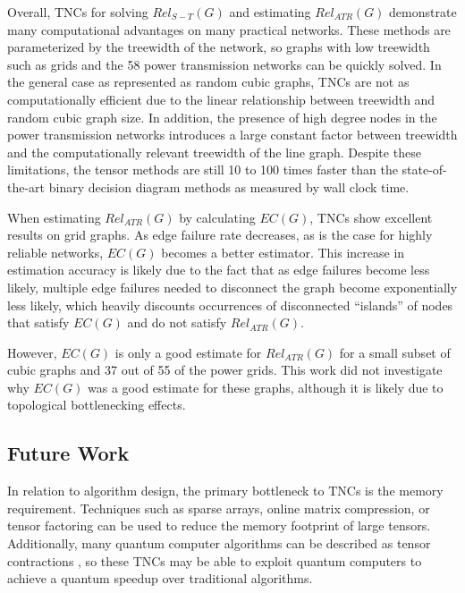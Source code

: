 \documentclass[12pt,twocolumn]{article}
\begin{document}
Overall, TNCs for solving \(Rel_{S-T}(G)\) and estimating \(Rel_{ATR}(G)\) demonstrate many computational advantages on many practical networks. These methods are parameterized by the treewidth of the network, so graphs with low treewidth such as grids and the 58 power transmission networks can be quickly solved. In the general case as represented as random cubic graphs, TNCs are not as computationally efficient due to the linear relationship between treewidth and random cubic graph size. In addition, the presence of high degree nodes in the power transmission networks introduces a large constant factor between treewidth and the computationally relevant treewidth of the line graph. Despite these limitations, the tensor methods are still 10 to 100 times faster than the state-of-the-art binary decision diagram methods as measured by wall clock time.

When estimating \(Rel_{ATR}(G)\) by calculating \(EC(G)\), TNCs show excellent results on grid graphs. As edge failure rate decreases, as is the case for highly reliable networks, \(EC(G)\) becomes a better estimator. This increase in estimation accuracy is likely due to the fact that as edge failures become less likely, multiple edge failures needed to disconnect the graph become exponentially less likely, which heavily discounts occurrences of disconnected ``islands'' of nodes that satisfy \(EC(G)\) and do not satisfy \(Rel_{ATR}(G)\).

However, \(EC(G)\) is only a good estimate for \(Rel_{ATR}(G)\) for a small subset of cubic graphs and 37 out of 55 of the power grids. This work did not investigate why \(EC(G)\) was a good estimate for these graphs, although it is likely due to topological bottlenecking effects.

\hypertarget{future-work}{%
\subsection{Future Work}\label{future-work}}

In relation to algorithm design, the primary bottleneck to TNCs is the memory requirement. Techniques such as sparse arrays, online matrix compression, or tensor factoring can be used to reduce the memory footprint of large tensors. Additionally, many quantum computer algorithms can be described as tensor contractions \cite{biamonte2017tensor} \cite{duenas2018quantum}, so these TNCs may be able to exploit quantum computers to achieve a quantum speedup over traditional algorithms.
\end{document}
